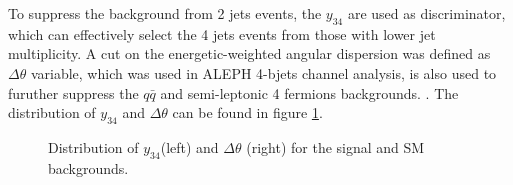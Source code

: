 To suppress the background from 2 jets events, the $y_{34}$ are used as discriminator, which can effectively select the 4 jets events 
from those with lower jet multiplicity. A cut on the energetic-weighted angular 
dispersion was defined as $\Delta\theta$ variable, 
which was used in ALEPH 4-bjets channel analysis\cite{ALEPH_ZH_PLB}, is also used to furuther suppress the $q\bar{q}$ and semi-leptonic 4 fermions backgrounds.
 . The distribution of $y_{34}$ and $\Delta\theta$ can be found in figure 
 \ref{fig:y34_Deltatheta}.
 \begin{figure}
\label{fig:y34_Deltatheta}
\centering
{}
\caption{Distribution of $y_{34}$(left) and $\Delta\theta$ (right) for the signal and SM backgrounds.}
\end{figure}
 \par 

